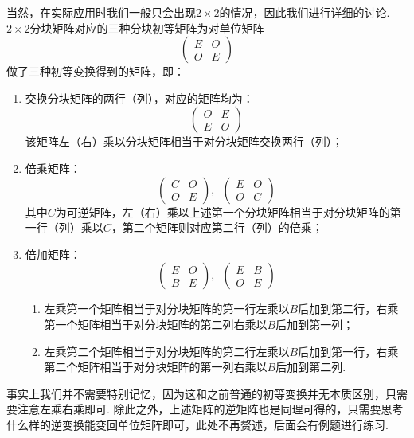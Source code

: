 当然，在实际应用时我们一般只会出现$2\times 2$的情况，因此我们进行详细的讨论. $2\times 2$分块矩阵对应的三种分块初等矩阵为对单位矩阵
\[\begin{pmatrix}
        E & O \\ O & E
    \end{pmatrix}\]做了三种初等变换得到的矩阵，即：
\begin{enumerate}
    \item 交换分块矩阵的两行（列），对应的矩阵均为：
          \[\begin{pmatrix}
                  O & E \\ E & O
              \end{pmatrix}\]
          该矩阵左（右）乘以分块矩阵相当于对分块矩阵交换两行（列）；

    \item 倍乘矩阵：
          \[\begin{pmatrix}
                  C & O \\ O & E
              \end{pmatrix},\enspace\begin{pmatrix}
                  E & O \\ O & C
              \end{pmatrix}\]
          其中$C$为可逆矩阵，左（右）乘以上述第一个分块矩阵相当于对分块矩阵的第一行（列）乘以$C$，第二个矩阵则对应第二行（列）的倍乘；

    \item 倍加矩阵：
          \[\begin{pmatrix}
                  E & O \\ B & E
              \end{pmatrix},\enspace\begin{pmatrix}
                  E & B \\ O & E
              \end{pmatrix}\]
          \begin{enumerate}
              \item 左乘第一个矩阵相当于对分块矩阵的第一行左乘以$B$后加到第二行，右乘第一个矩阵相当于对分块矩阵的第二列右乘以$B$后加到第一列；

              \item 左乘第二个矩阵相当于对分块矩阵的第二行左乘以$B$后加到第一行，右乘第二个矩阵相当于对分块矩阵的第一列右乘以$B$后加到第二列.
          \end{enumerate}
\end{enumerate}

事实上我们并不需要特别记忆，因为这和之前普通的初等变换并无本质区别，只需要注意左乘右乘即可. 除此之外，上述矩阵的逆矩阵也是同理可得的，只需要思考什么样的逆变换能变回单位矩阵即可，此处不再赘述，后面会有例题进行练习.

